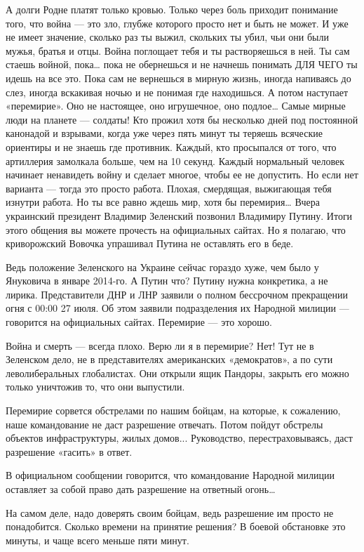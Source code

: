 \documentclass[a4paper,11pt]{extreport}
\begin{document}
А долги Родне платят только кровью. Только через боль приходит понимание того, что война --- это зло, глубже которого просто нет и быть не может. И уже не имеет значение, сколько раз ты выжил, скольких ты убил, чьи они были мужья, братья и отцы. Война поглощает тебя и ты растворяешься в ней. Ты сам стаешь войной, пока… пока не обернешься и не начнешь понимать ДЛЯ ЧЕГО ты идешь на все это. Пока сам не вернешься в мирную жизнь, иногда напиваясь до слез, иногда вскакивая ночью и не понимая где находишься.
А потом наступает «перемирие». Оно не настоящее, оно игрушечное, оно подлое… Самые мирные люди на планете --- солдаты! Кто прожил хотя бы несколько дней под постоянной канонадой и взрывами, когда уже через пять минут ты теряешь всяческие ориентиры и не знаешь где противник. Каждый, кто просыпался от того, что артиллерия замолкала больше, чем на 10 секунд. Каждый нормальный человек начинает ненавидеть войну и сделает многое, чтобы ее не допустить. Но если нет варианта --- тогда это просто работа. Плохая, смердящая, выжигающая тебя изнутри работа.
Но ты все равно ждешь мир, хотя бы перемирия…
Вчера украинский президент Владимир Зеленский позвонил Владимиру Путину. Итоги этого общения вы можете прочесть на официальных сайтах.
Но я полагаю, что криворожский Вовочка упрашивал Путина не оставлять его в беде.

Ведь положение Зеленского на Украине сейчас гораздо хуже, чем было у Януковича в январе 2014-го.
А Путин что?
Путину нужна конкретика, а не лирика.
Представители ДНР и ЛНР заявили о полном бессрочном прекращении огня с 00:00 27 июля.
Об этом заявили подразделения их Народной милиции --- говорится на официальных сайтах.
Перемирие --- это хорошо.

Война и смерть --- всегда плохо. Верю ли я в перемирие?
Нет!
Тут не в Зеленском дело, не в представителях американских «демократов», а по сути леволиберальных глобалистах. Они открыли ящик Пандоры, закрыть его можно только уничтожив то, что они выпустили.

Перемирие сорвется обстрелами по нашим бойцам, на которые, к сожалению, наше командование не даст разрешение отвечать. Потом пойдут обстрелы объектов инфраструктуры, жилых домов...
Руководство, перестраховываясь, даст разрешение «гасить» в ответ.

В официальном сообщении говорится, что командование Народной милиции оставляет за собой право дать разрешение на ответный огонь…

На самом деле, надо доверять своим бойцам, ведь разрешение им просто не понадобится. Сколько времени на принятие решения?
В боевой обстановке это минуты, и чаще всего меньше пяти минут.
\end{document}

